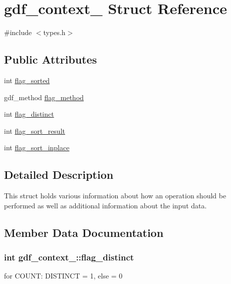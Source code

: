 \hypertarget{structgdf__context__}{}\section{gdf\+\_\+context\+\_\+ Struct Reference}
\label{structgdf__context__}


{\ttfamily \#include $<$types.\+h$>$}

\subsection*{Public Attributes}
\begin{DoxyCompactItemize}
\item 
int \hyperlink{structgdf__context___afb8cf060524049e9c05a3cfe523528cd}{flag\+\_\+sorted}
\item 
gdf\+\_\+method \hyperlink{structgdf__context___a835f25957aee3644e44dae95fcee9824}{flag\+\_\+method}
\item 
int \hyperlink{structgdf__context___ad37c154f7eb77796490dd56f74f5485c}{flag\+\_\+distinct}
\item 
int \hyperlink{structgdf__context___a85dc10323c2f955a715d2edad1618835}{flag\+\_\+sort\+\_\+result}
\item 
int \hyperlink{structgdf__context___ac694627cbc70f39bc249a99876baf8de}{flag\+\_\+sort\+\_\+inplace}
\end{DoxyCompactItemize}


\subsection{Detailed Description}
This struct holds various information about how an operation should be performed as well as additional information about the input data. 

\subsection{Member Data Documentation}
\subsubsection[{\texorpdfstring{flag\+\_\+distinct}{flag_distinct}}]{\setlength{\rightskip}{0pt plus 5cm}int gdf\+\_\+context\+\_\+\+::flag\+\_\+distinct}\hypertarget{structgdf__context___ad37c154f7eb77796490dd56f74f5485c}{}\label{structgdf__context___ad37c154f7eb77796490dd56f74f5485c}
for C\+O\+U\+NT\+: D\+I\+S\+T\+I\+N\+CT = 1, else = 0 
